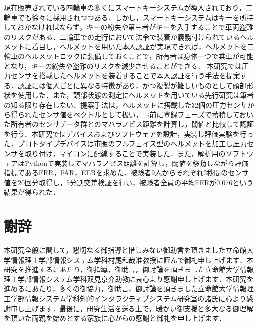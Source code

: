 \documentclass[uplatex, 12pt, papersize]{jsbook}
\begin{document}

\thesisKind{\BachelorThesis} %

\makeThesisTitle

現在販売されている四輪車の多くにスマートキーシステムが導入されており，二輪車でも徐々に採用されつつある．しかし，スマートキーシステムはキーを所持しておかなければならず，キーの紛失や第三者がキーを入手することで車両盗難のリスクがある．二輪車での走行において法令で装着が義務付けられているヘルメットに着目し，ヘルメットを用いた本人認証が実現できれば，ヘルメットを二輪車のヘルメットロックに装備しておくことで，所有者は身体一つで乗車が可能となり，キーの紛失や盗難のリスクを減少させることができる．
本研究では圧力センサを搭載したヘルメットを装着することで本人認証を行う手法を提案する．認証には個人ごとに異なる特徴があり，かつ複製が難しいものとして頭部形状を使用した．また，頭部状態の測定にヘルメットを用いている先行研究は筆者の知る限り存在しない．提案手法は，ヘルメットに搭載した32個の圧力センサから得られたセンサ値をベクトルとして扱い，事前に登録フェーズで蓄積しておいた所有者のセンサデータ群とのマハラノビス距離を計算し，閾値と比較して認証を行う．本研究ではデバイスおよびソフトウェアを設計，実装し評価実験を行った．プロトタイプデバイスは市販のフルフェイス型のヘルメットを加工し圧力センサを取り付け，マイコンに配線することで実装した．また，解析用のソフトウェアはPythonで実装してマハラノビス距離を計算し，閾値を移動しながら評価指標であるFRR，FAR，EERを求めた．被験者9人からそれぞれ2秒間のセンサ値を20回分取得し，5分割交差検証を行い，被験者全員の平均EERが0.076という結果が得られた．

\tableofcontents %
\listoffigures %
\listoftables %

\startMain








\chapter*{謝辞}
本研究全般に関して，懇切なる御指導と惜しみない御助言を頂きました立命館大学情報理工学部情報システム学科村尾和哉准教授に謹んで御礼申し上げます．本研究を推進するにあたり，御指導，御助言，御討論を頂きました立命館大学情報理工学部情報システム学科双見京介助教に衷心より感謝申し上げます．本研究を進めるにあたり，多くの御協力，御助言，御討論を頂きました立命館大学情報理工学部情報システム学科知的インタラクティブシステム研究室の諸氏に心より感謝申し上げます．最後に，研究生活を送る上で，暖かい御支援と多大なる御理解を頂いた両親を始めとする家族に心からの感謝と御礼を申し上げます．



\end{document}
